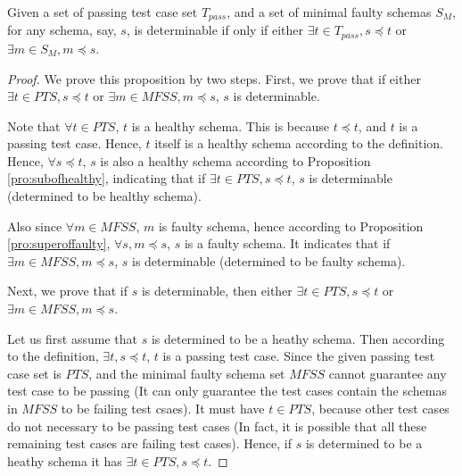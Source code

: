 \begin{proposition}\label{pro:determinableparthealthyfaulty}
Given a set of passing test case set $T_{pass}$, and a set of minimal faulty schemas $S_{M}$, for any schema, say, $s$, is determinable if only if either $\exists t \in T_{pass}, s \preceq t$ or $\exists m \in S_{M}, m \preceq s$.
\end{proposition}

\begin{proof}
We prove this proposition by two steps. First, we prove that if either $\exists t \in PTS, s \preceq t$ or $\exists m \in MFSS, m \preceq s$, $s$ is determinable.

Note that $\forall t \in PTS$, $t$ is a healthy schema. This is because $t \preceq t$, and $t$ is a passing test case. Hence, $t$ itself is a healthy schema according to the definition. Hence, $\forall s \preceq t$, $s$ is also a healthy schema according to Proposition \ref{pro:subofhealthy}, indicating that if $\exists t \in PTS, s \preceq t$, $s$ is determinable (determined to be healthy schema).

Also since $\forall m \in MFSS$, $m$ is faulty schema, hence according to Proposition \ref{pro:superoffaulty}, $\forall s,  m \preceq s$, $s$ is a faulty schema. It indicates that if $\exists m \in MFSS, m \preceq s$, $s$ is determinable (determined to be faulty schema).



Next, we prove that if $s$ is determinable, then either $\exists t \in PTS, s \preceq t$ or $\exists m \in MFSS, m \preceq s$.

Let us first assume that $s$ is determined to be a heathy schema. Then according to the definition, $\exists t, s \preceq t$, $t$ is a passing test case. Since the given passing test case set is $PTS$, and the minimal faulty schema set $MFSS$ cannot guarantee any test case to be passing (It can only guarantee the test cases contain the schemas in $MFSS$ to be failing test csaes). It must have $t \in PTS$, because other test cases do not necessary to be passing test cases (In fact, it is possible that all these remaining test cases are failing test cases). Hence, if $s$ is determined to be a heathy schema it has $\exists t \in PTS, s \preceq t$.


\end{proof}
